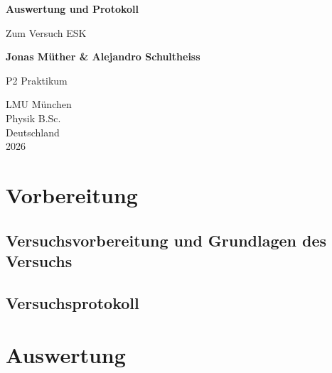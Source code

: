 \documentclass{report}
\begin{document}

\begin{titlepage}
    \begin{center}
        \vspace*{1cm}
            
        \Huge
        \textbf{Auswertung und Protokoll}
            
        \vspace{0.5cm}
        \LARGE
        Zum Versuch ESK
        
        \vspace{1.8cm}

        \textbf{Jonas Müther \& Alejandro Schultheiss}
        \vfill
            
        P2 Praktikum\\
       
            
        \vspace{0.8cm}
  

        \vspace{1.8cm}
        \Large
        LMU München \\
        Physik B.Sc.\\
        Deutschland\\
        2026
            
    \end{center}
\end{titlepage}
\tableofcontents

\newpage
\chapter{Vorbereitung}

\section{Versuchsvorbereitung und Grundlagen des Versuchs}


\section{Versuchsprotokoll}


\newpage
\chapter{Auswertung}
\end{document}
